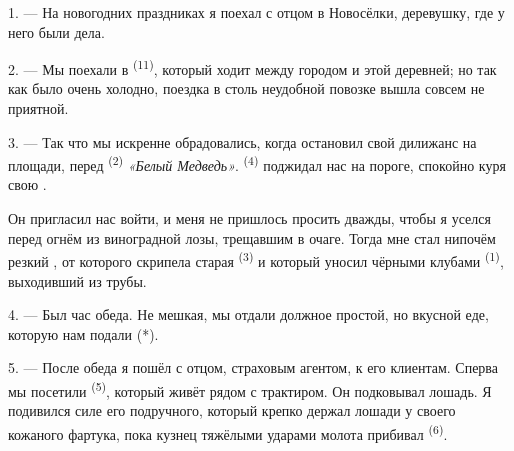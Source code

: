 

\VUsaut{4.0mm}
\VUsaut{3.0mm}
\VUfilet{16mm}
\VUsaut{5.6mm}
\VUsaut{3.0mm}

\VUsaut{3.0mm}

\VUsaut{4.0mm}

1. --- На новогодних праздниках я поехал с отцом в Новосёлки, деревушку,
где у него были дела.

2. --- Мы поехали в  \textsuperscript{(11)}, который ходит между
городом и этой деревней; но так как было очень холодно, поездка в столь
неудобной повозке вышла совсем не приятной.

3. --- Так что мы искренне обрадовались, когда  остановил
свой дилижанс на площади, перед  \textsuperscript{(2)}
\textit{«Белый Медведь»}.  \textsuperscript{(4)} поджидал нас
на пороге, спокойно куря свою .

Он пригласил нас войти, и меня не пришлось просить дважды, чтобы я уселся
перед огнём из виноградной лозы, трещавшим в очаге. Тогда мне стал
нипочём резкий , от которого скрипела старая
 \textsuperscript{(3)} и который уносил чёрными клубами
 \textsuperscript{(1)}, выходивший из трубы.

4. --- Был час обеда. Не мешкая, мы отдали должное простой, но вкусной
еде, которую нам подали (*).

\VUsaut{3.0mm}

5. --- После обеда я пошёл с отцом, страховым агентом, к его клиентам.
Сперва мы посетили  \textsuperscript{(5)}, который живёт рядом с
трактиром. Он подковывал лошадь. Я подивился силе его подручного, который
крепко держал  лошади у своего кожаного фартука, пока
кузнец тяжёлыми ударами молота прибивал  \textsuperscript{(6)}.

